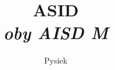\documentclass{article}
\title{ASID\medskip\\ \emph{\scriptsize oby AISD M}}
\author{Pysiek}
\begin{document}
\maketit

\tableofcontents
\newpage


\end{document}
